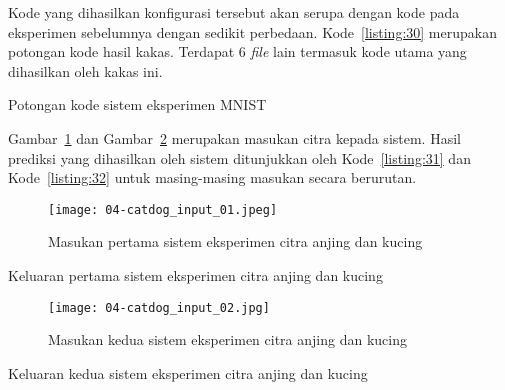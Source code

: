 Kode yang dihasilkan konfigurasi tersebut akan serupa dengan kode pada eksperimen sebelumnya dengan sedikit perbedaan.
Kode~\ref{listing:30} merupakan potongan kode hasil kakas.
Terdapat 6 \textit{file} lain termasuk kode utama yang dihasilkan oleh kakas ini.

\begin{code}
	\caption{Potongan kode sistem eksperimen MNIST}\label{listing:30}
\end{code}

Gambar~\ref{fig:04-catdog-input-01} dan Gambar~\ref{fig:04-catdog-input-02} merupakan masukan citra kepada sistem.
Hasil prediksi yang dihasilkan oleh sistem ditunjukkan oleh Kode~\ref{listing:31} dan Kode~\ref{listing:32} untuk masing-masing masukan secara berurutan.

\begin{figure}[ht]
  \vspace{\baselineskip}
    \centering
    \texttt{[image: 04-catdog\_input\_01.jpeg]}
	\caption{Masukan pertama sistem eksperimen citra anjing dan kucing}\label{fig:04-catdog-input-01}
\end{figure}

\begin{code}
	\caption{Keluaran pertama sistem eksperimen citra anjing dan kucing}\label{listing:31}
\end{code}

\begin{figure}[ht]
  \vspace{\baselineskip}
    \centering
	\texttt{[image: 04-catdog\_input\_02.jpg]}
	\caption{Masukan kedua sistem eksperimen citra anjing dan kucing}\label{fig:04-catdog-input-02}
\end{figure}

\begin{code}
	\caption{Keluaran kedua sistem eksperimen citra anjing dan kucing}\label{listing:32}
\end{code}